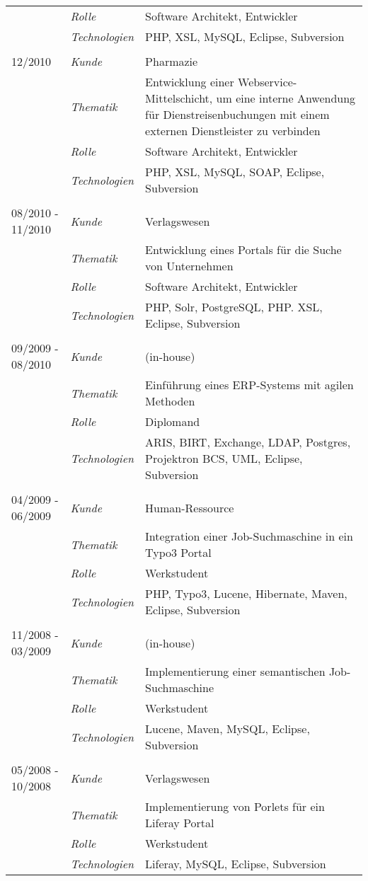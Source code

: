 \begin{longtable}{@{}>{}p{4cm}>{\itshape}p{2cm}>{}p{9cm}}
\nopagebreak		& Rolle 	    & Software Architekt, Entwickler\\
\nopagebreak		& Technologien	& PHP, XSL, MySQL, Eclipse, Subversion\\
\\
12/2010         	& Kunde 	    & Pharmazie\\
\nopagebreak		& Thematik	    & Entwicklung einer Webservice-Mittelschicht, um eine interne Anwendung für Dienstreisenbuchungen mit einem externen Dienstleister zu verbinden\\
\nopagebreak		& Rolle 	    & Software Architekt, Entwickler\\
\nopagebreak		& Technologien	& PHP, XSL, MySQL, SOAP, Eclipse, Subversion\\
\\
08/2010 - 11/2010	& Kunde 	    & Verlagswesen\\
\nopagebreak		& Thematik	    & Entwicklung eines Portals für die Suche von Unternehmen\\
\nopagebreak		& Rolle 	    & Software Architekt, Entwickler\\
\nopagebreak		& Technologien	& PHP, Solr, PostgreSQL, PHP. XSL, Eclipse, Subversion\\
\\
09/2009 - 08/2010	& Kunde 	    & (in-house)\\
\nopagebreak		& Thematik	    & Einführung eines ERP-Systems mit agilen Methoden\\
\nopagebreak		& Rolle 	    & Diplomand\\
\nopagebreak		& Technologien	& ARIS, BIRT, Exchange, LDAP, Postgres, Projektron BCS, UML, Eclipse, Subversion\\
\\
04/2009 - 06/2009	& Kunde 	    & Human-Ressource\\
\nopagebreak		& Thematik	    & Integration einer Job-Suchmaschine in ein Typo3 Portal\\
\nopagebreak		& Rolle 	    & Werkstudent\\
\nopagebreak		& Technologien	& PHP, Typo3, Lucene, Hibernate, Maven, Eclipse, Subversion\\
\\
11/2008 - 03/2009	& Kunde 	& (in-house)\\
\nopagebreak		& Thematik	& Implementierung einer semantischen Job-Suchmaschine\\
\nopagebreak		& Rolle 	& Werkstudent\\
\nopagebreak		& Technologien	& Lucene, Maven, MySQL, Eclipse, Subversion\\
\\
05/2008 - 10/2008	& Kunde 	& Verlagswesen\\
\nopagebreak		& Thematik	& Implementierung von Porlets für ein Liferay Portal\\
\nopagebreak		& Rolle 	& Werkstudent\\
\nopagebreak		& Technologien	& Liferay, MySQL, Eclipse, Subversion\\
\end{longtable}
\renewcommand{\arraystretch}{2}


